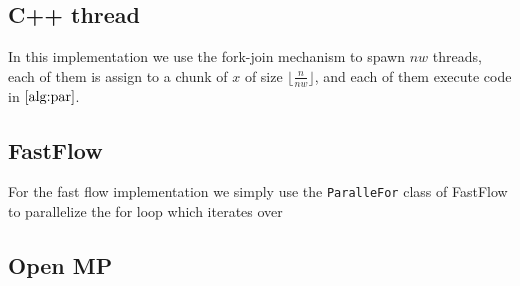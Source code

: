 \documentclass{article}
\begin{document}
	\subsection{C++ thread}
	In this implementation we use the fork-join mechanism to spawn $nw$ threads, each of them is assign to a chunk of $x$ of size $\lfloor\frac{n}{nw}\rfloor$, and each of them execute code in $\ref{alg:par}$.
	\subsection{FastFlow}
	For the fast flow implementation we simply use the \verb|ParalleFor| class of FastFlow to parallelize the for loop which iterates over 
	
	\subsection{Open MP}
	
	
	
\end{document}
